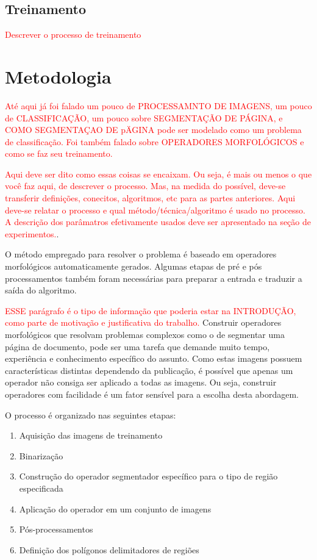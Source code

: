 \documentclass[a4paper,11pt]{article}
\newcommand{\TODO}[1]{\textcolor{red}{#1}}
\begin{document}
\subsection{Treinamento}

\TODO{Descrever o processo de treinamento}







\section{Metodologia}

\TODO{Até aqui já foi falado um pouco de PROCESSAMNTO DE IMAGENS, um
  pouco de CLASSIFICAÇÃO, um pouco sobre SEGMENTAÇÃO DE PÁGINA, e COMO
  SEGMENTAÇAO DE pÄGINA pode ser modelado como um problema de
  classificação. Foi também falado sobre OPERADORES MORFOLÓGICOS e
  como se faz seu treinamento.}

\TODO{Aqui deve ser dito como essas coisas se encaixam. Ou seja, é
  mais ou menos o que você faz aqui, de descrever o processo. Mas, na
  medida do possível, deve-se transferir definições, conecitos,
  algoritmos, etc para as partes anteriores. Aqui deve-se relatar o
  processo e qual método/técnica/algoritmo é usado no processo. A
  descrição dos parâmatros efetivamente usados deve ser apresentado na
seção de experimentos.}.

O método empregado para resolver o problema é baseado em operadores morfológicos automaticamente gerados. Algumas etapas de pré e pós processamentos também foram necessárias para preparar a entrada e traduzir a saída do algoritmo.


\TODO{ESSE parágrafo é o tipo de informação que poderia estar na
  INTRODUÇÃO, como parte de motivação e justificativa do trabalho.}
Construir operadores morfológicos que resolvam problemas complexos como o de segmentar uma página de documento, pode ser uma tarefa que demande muito tempo, experiência e conhecimento específico do assunto. Como estas imagens possuem características distintas dependendo da publicação, é possível que apenas um operador não consiga ser aplicado a todas as imagens. Ou seja, construir operadores com facilidade é um fator sensível para a escolha desta abordagem.


    O processo é organizado nas seguintes etapas:

    \begin{enumerate}
      \item Aquisição das imagens de treinamento
      \item Binarização
      \item Construção do operador segmentador específico para o tipo de região especificada
      \item Aplicação do operador em um conjunto de imagens
      \item Pós-processamentos
      \item Definição dos polígonos delimitadores de regiões
    \end{enumerate}
\end{document}
